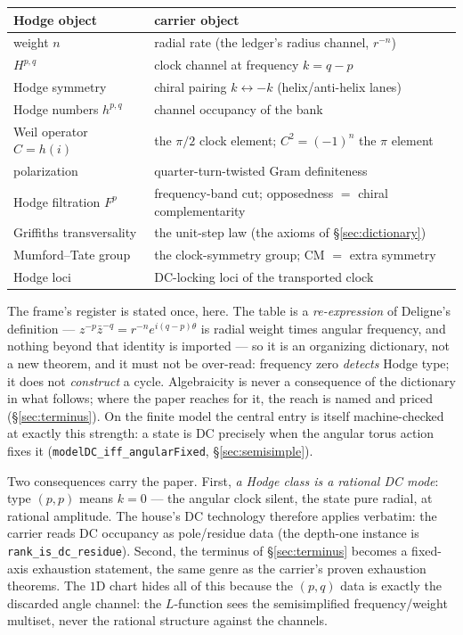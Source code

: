 \documentclass[11pt]{article}
\theoremstyle{definition}
\theoremstyle{remark}
\begin{document}
\begin{center}
\begin{tabular}{@{}ll@{}}
\toprule
Hodge object & carrier object \\
\midrule
weight $n$ & radial rate (the ledger's radius channel, $r^{-n}$) \\
$H^{p,q}$ & clock channel at frequency $k=q-p$ \\
Hodge symmetry & chiral pairing $k\leftrightarrow-k$ (helix/anti-helix lanes) \\
Hodge numbers $h^{p,q}$ & channel occupancy of the bank \\
Weil operator $C=h(i)$ & the $\pi/2$ clock element; $C^2=(-1)^n$ the $\pi$ element \\
polarization & quarter-turn-twisted Gram definiteness \\
Hodge filtration $F^p$ & frequency-band cut; opposedness $=$ chiral complementarity \\
Griffiths transversality & the unit-step law (the axioms of \S\ref{sec:dictionary}) \\
Mumford--Tate group & the clock-symmetry group; CM $=$ extra symmetry \\
Hodge loci & DC-locking loci of the transported clock \\
\bottomrule
\end{tabular}
\end{center}

The frame's register is stated once, here. The table is a \emph{re-expression}
of Deligne's definition --- $z^{-p}\bar z^{-q}=r^{-n}e^{i(q-p)\theta}$ is
radial weight times angular frequency, and nothing beyond that identity is
imported --- so it is an organizing dictionary, not a new theorem, and it must
not be over-read: frequency zero \emph{detects} Hodge type; it does not
\emph{construct} a cycle. Algebraicity is never a consequence of the dictionary
in what follows; where the paper reaches for it, the reach is named and priced
(\S\ref{sec:terminus}). On the finite model the central entry is itself
machine-checked at exactly this strength: a state is DC precisely when the
angular torus action fixes it (\texttt{modelDC\_iff\_angularFixed},
\S\ref{sec:semisimple}).

Two consequences carry the paper. First, \emph{a Hodge class is a rational DC
mode}: type $(p,p)$ means $k=0$ --- the angular clock silent, the state pure
radial, at rational amplitude. The house's DC technology therefore applies
verbatim: the carrier reads DC occupancy as pole/residue data (the depth-one
instance is \texttt{rank\_is\_dc\_residue}). Second, the terminus of
\S\ref{sec:terminus} becomes a fixed-axis exhaustion statement, the same genre
as the carrier's proven exhaustion theorems. The $1$D chart hides all of this
because the $(p,q)$ data is exactly the discarded angle channel: the
$L$-function sees the semisimplified frequency/weight multiset, never the
rational structure against the channels.
\end{document}
